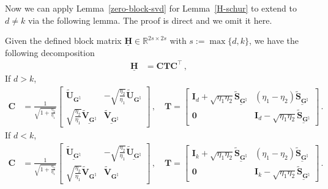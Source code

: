 Now we can apply Lemma~\ref{zero-block-svd} for Lemma~\ref{H-schur} to extend to $d\neq k$ via the following lemma.
The proof is direct and we omit it here.
\begin{lemma}
\label{lemma:Hdnk}
    Given the defined block matrix $\underline{\bm H} \in \mathbb{R}^{2s \times 2s}$ with $s:=\max\{ d,k \}$, we have the following decomposition
    \begin{align*}
        \underline{\bm H} & = \mathbf{C}\mathbf{T}\mathbf{C}^{\!\top}\,,
    \end{align*}
    If $d>k$,
    \begin{align*}
        \mathbf{C} & = \frac{1}{\sqrt{1+\frac{\eta_2}{\eta_1}}}\begin{bmatrix}
        \widetilde{\bm U}_{\bm G^\natural} & -\sqrt{\frac{\eta_2}{\eta_1}}\widetilde{\bm U}_{\bm G^\natural}\\
        \sqrt{\frac{\eta_2}{\eta_1}}\underline{\widetilde{\bm V}_{\bm G^\natural}} & \underline{\widetilde{\bm V}_{\bm G^\natural}}
    \end{bmatrix}\,,\quad
        \mathbf{T} = \begin{bmatrix}
        \bm I_d+\sqrt{\eta_1\eta_2}\underline{\widetilde{\bm S}_{\bm G^\natural}} & (\eta_1 - \eta_2)\underline{\widetilde{\bm S}_{\bm G^\natural}} \\
        \bm 0 & \bm I_d-\sqrt{\eta_1\eta_2}\underline{\widetilde{\bm S}_{\bm G^\natural}}
        \end{bmatrix}\,.
    \end{align*}
    If $d<k$,
    \begin{align*}
        \mathbf{C} & = \frac{1}{\sqrt{1+\frac{\eta_2}{\eta_1}}}\begin{bmatrix}
        \underline{\widetilde{\bm U}_{\bm G^\natural}} & -\sqrt{\frac{\eta_2}{\eta_1}}\underline{\widetilde{\bm U}_{\bm G^\natural}}\\
        \sqrt{\frac{\eta_2}{\eta_1}}{\widetilde{\bm V}_{\bm G^\natural}} & {\widetilde{\bm V}_{\bm G^\natural}}
    \end{bmatrix}\,,\quad
        \mathbf{T} = \begin{bmatrix}
        \bm I_k+\sqrt{\eta_1\eta_2}\underline{\widetilde{\bm S}_{\bm G^\natural}} & (\eta_1 - \eta_2)\underline{\widetilde{\bm S}_{\bm G^\natural}} \\
        \bm 0 & \bm I_k-\sqrt{\eta_1\eta_2}\underline{\widetilde{\bm S}_{\bm G^\natural}}
        \end{bmatrix}\,.
    \end{align*}
\end{lemma}


